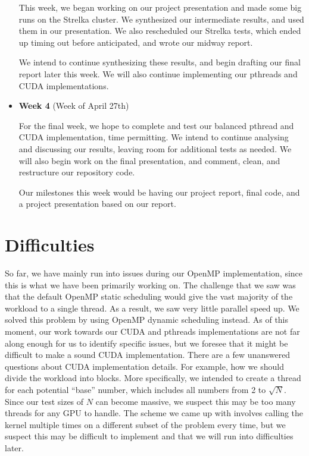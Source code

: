 \documentclass[11pt]{article}
\begin{document}
\begin{itemize}
     This week, we began working on our project presentation and made some big 
     runs on the Strelka cluster. We synthesized our intermediate results, and used
     them in our presentation. We also rescheduled our Strelka tests, which ended 
     up timing out before anticipated, and wrote our midway report.    
     
     We intend to continue synthesizing these results, and begin drafting our final 
     report later this week. We will also continue implementing our pthreads and 
     CUDA implementations.
     \vspace{0.1in}
    
    \item \textbf{Week 4} (Week of April 27th)
    
     For the final week, we hope to complete and test our balanced pthread and CUDA
     implementation, time permitting. We intend to continue analysing and discussing
     our results, leaving room for additional tests as needed. We will also begin work 
     on the final presentation, and comment, clean, and restructure our repository code.
     
     Our milestones this week would be having our project report, final code, and a
     project presentation based on our report.
    
\end{itemize}

\section {Difficulties}
{\it
}

So far, we have mainly run into issues during our OpenMP implementation, since
this is what we have been primarily working on. The challenge that we saw was that
the default OpenMP static scheduling would give the vast majority of the workload
to a single thread. As a result, we saw very little parallel speed up. We solved
this problem by using OpenMP dynamic scheduling instead. As of this moment, our
work towards our CUDA and pthreads implementations are not far along enough
for us to identify specific issues, but we foresee that it might be difficult
to make a sound CUDA implementation. There are a few unanswered questions about
CUDA implementation details. For example, how we should divide the workload into
blocks. More specifically, we intended to create a thread for each potential
``base'' number, which includes all numbers from 2 to $\sqrt{N}$. Since our
test sizes of $N$ can become massive, we suspect this may be too many threads
for any GPU to handle. The scheme we came up with involves calling the kernel
multiple times on a different subset of the problem every time, but we suspect
this may be difficult to implement and that we will run into difficulties later.
\end{document}
